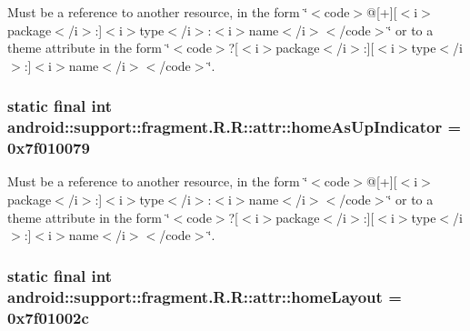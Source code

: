 Must be a reference to another resource, in the form \char`\"{}$<$code$>$@\mbox{[}+\mbox{]}\mbox{[}$<$i$>$package$<$/i$>$:\mbox{]}$<$i$>$type$<$/i$>$:$<$i$>$name$<$/i$>$$<$/code$>$\char`\"{} or to a theme attribute in the form \char`\"{}$<$code$>$?\mbox{[}$<$i$>$package$<$/i$>$:\mbox{]}\mbox{[}$<$i$>$type$<$/i$>$:\mbox{]}$<$i$>$name$<$/i$>$$<$/code$>$\char`\"{}. \hypertarget{classandroid_1_1support_1_1fragment_1_1_r_1_1attr_c169d59e50c26d3f943fdbc6c18c5275}{
\subsubsection[{homeAsUpIndicator}]{\setlength{\rightskip}{0pt plus 5cm}static final int android::support::fragment.R.R::attr::homeAsUpIndicator = 0x7f010079}}
\label{classandroid_1_1support_1_1fragment_1_1_r_1_1attr_c169d59e50c26d3f943fdbc6c18c5275}


Must be a reference to another resource, in the form \char`\"{}$<$code$>$@\mbox{[}+\mbox{]}\mbox{[}$<$i$>$package$<$/i$>$:\mbox{]}$<$i$>$type$<$/i$>$:$<$i$>$name$<$/i$>$$<$/code$>$\char`\"{} or to a theme attribute in the form \char`\"{}$<$code$>$?\mbox{[}$<$i$>$package$<$/i$>$:\mbox{]}\mbox{[}$<$i$>$type$<$/i$>$:\mbox{]}$<$i$>$name$<$/i$>$$<$/code$>$\char`\"{}. \hypertarget{classandroid_1_1support_1_1fragment_1_1_r_1_1attr_459d1a04db1d34677c7859049d5ff992}{
\subsubsection[{homeLayout}]{\setlength{\rightskip}{0pt plus 5cm}static final int android::support::fragment.R.R::attr::homeLayout = 0x7f01002c}}
\label{classandroid_1_1support_1_1fragment_1_1_r_1_1attr_459d1a04db1d34677c7859049d5ff992}


